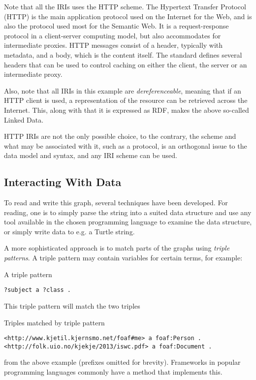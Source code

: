 Note that all the IRIs uses the HTTP scheme. The Hypertext Transfer
Protocol (HTTP) is the main application protocol used on the Internet
for the Web, and is also the protocol used most for the Semantic
Web. It is a request-response protocol in a client-server computing
model, but also accommodates for intermediate proxies. HTTP messages
consist of a header, typically with metadata, and a body, which is the
content itself. The standard defines several headers that can be used
to control caching on either the client, the server or an intermediate
proxy.

Also, note that all IRIs in this example are \emph{dereferenceable},
meaning that if an HTTP client is used, a representation of the
resource can be retrieved across the Internet. This, along with that
it is expressed as RDF, makes the above so-called Linked Data.

HTTP IRIs are not the only possible choice, to the contrary, the
scheme and what may be associated with it, such as a protocol, is an
orthogonal issue to the data model and syntax, and any IRI scheme can
be used.

\subsection{Interacting With Data}\label{sec:introinteract}

To read and write this graph, several techniques have been
developed. For reading, one is to simply parse the string into a
suited data structure and use any tool available in the chosen
programming language to examine the data structure, or simply write
data to e.g. a Turtle string.

A more sophisticated approach is to match parts of the graphs using
\emph{triple patterns}. A triple pattern may contain variables for
certain terms, for example:

\begin{example}{A triple pattern}
\begin{verbatim}
?subject a ?class .
\end{verbatim}
\end{example}
This triple pattern will match the two triples 
\begin{example}{Triples matched by triple pattern}
\small
\begin{verbatim}
<http://www.kjetil.kjernsmo.net/foaf#me> a foaf:Person .
<http://folk.uio.no/kjekje/2013/iswc.pdf> a foaf:Document .
\end{verbatim}
\normalsize
\end{example}
from the above example (prefixes omitted for brevity). Frameworks in
popular programming languages commonly have a method that implements
this.

